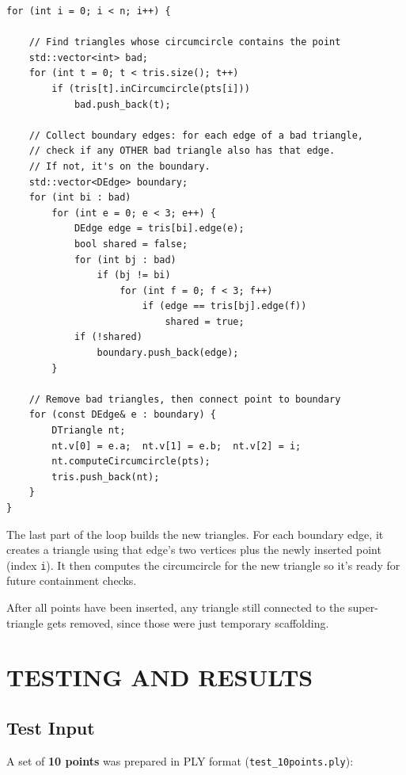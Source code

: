 \documentclass[12pt]{extreport}
\begin{document}
\begin{lstlisting}[style=cppstyle]
for (int i = 0; i < n; i++) {

    // Find triangles whose circumcircle contains the point
    std::vector<int> bad;
    for (int t = 0; t < tris.size(); t++)
        if (tris[t].inCircumcircle(pts[i]))
            bad.push_back(t);

    // Collect boundary edges: for each edge of a bad triangle,
    // check if any OTHER bad triangle also has that edge.
    // If not, it's on the boundary.
    std::vector<DEdge> boundary;
    for (int bi : bad)
        for (int e = 0; e < 3; e++) {
            DEdge edge = tris[bi].edge(e);
            bool shared = false;
            for (int bj : bad)
                if (bj != bi)
                    for (int f = 0; f < 3; f++)
                        if (edge == tris[bj].edge(f))
                            shared = true;
            if (!shared)
                boundary.push_back(edge);
        }

    // Remove bad triangles, then connect point to boundary
    for (const DEdge& e : boundary) {
        DTriangle nt;
        nt.v[0] = e.a;  nt.v[1] = e.b;  nt.v[2] = i;
        nt.computeCircumcircle(pts);
        tris.push_back(nt);
    }
}
\end{lstlisting}

The last part of the loop builds the new triangles. For each boundary edge, it creates a triangle using that edge's two vertices plus the newly inserted point (index \texttt{i}). It then computes the circumcircle for the new triangle so it's ready for future containment checks.

After all points have been inserted, any triangle still connected to the super-triangle gets removed, since those were just temporary scaffolding.

\chapter{TESTING AND RESULTS}

\section{Test Input}
A set of \textbf{10 points} was prepared in PLY format (\texttt{test\_10points.ply}):
\end{document}
